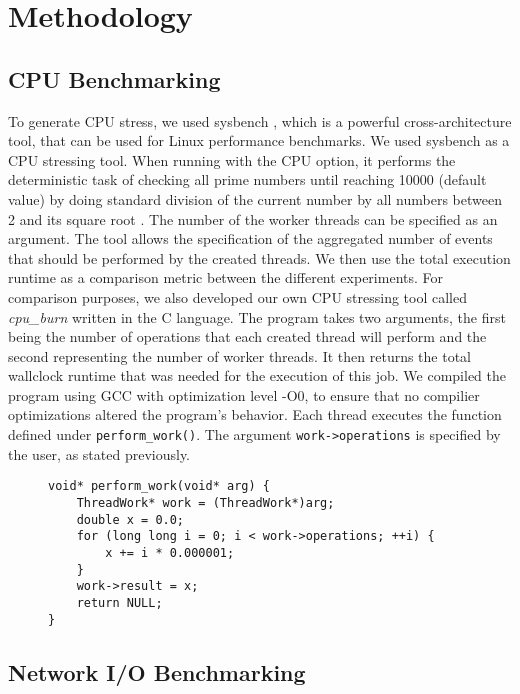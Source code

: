 \chapter{Methodology}

\section{CPU Benchmarking}
To generate CPU stress, we used sysbench \cite{sysbench}, which is a powerful cross-architecture tool, 
that can be used for Linux performance benchmarks. We used sysbench as a 
CPU stressing tool. When running with the CPU option, it performs the deterministic task of checking 
all prime numbers until reaching 10000 (default value) by doing standard division of the current number 
by all numbers between 2 and its square root \cite{gentoo_sysbench}. The number of the worker threads 
can be specified as an argument. The tool allows the specification of the aggregated number of events that 
should be performed by the created threads. We then use the total execution runtime as a comparison metric 
between the different experiments. For comparison purposes, we also developed our own CPU stressing 
tool called \textit{cpu\_burn} written in the C language. The program takes two arguments, the first 
being the number of operations that each created thread will perform and the second representing 
the number of worker threads. It then returns the total wallclock runtime that was needed for the 
execution of this job. 
We compiled the program using GCC with optimization level -O0, to ensure that no compilier optimizations
altered the program's behavior. Each thread executes the function defined under \texttt{perform\_work()}. 
The argument \texttt{work->operations} is specified by the user, as stated previously.

\begin{figure}[H]
\begin{lstlisting}[caption={Workload of the cpu\_burn tool}]
void* perform_work(void* arg) {
    ThreadWork* work = (ThreadWork*)arg;
    double x = 0.0;
    for (long long i = 0; i < work->operations; ++i) {
        x += i * 0.000001;
    }
    work->result = x;
    return NULL;
}
\end{lstlisting}
\end{figure}

\section{Network I/O Benchmarking}
